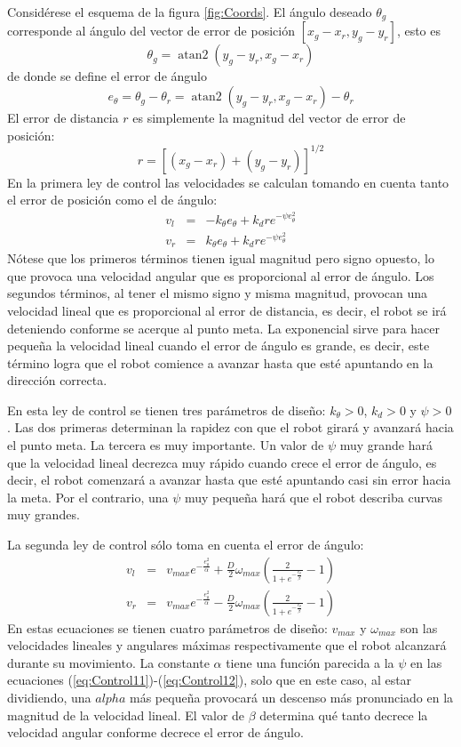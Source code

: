 \documentclass[letterpaper,12pt]{article}
\DeclareMathOperator{\atantwo}{atan2}
\begin{document}
Considérese el esquema de la figura \ref{fig:Coords}. El ángulo deseado $\theta_g$ corresponde al ángulo del vector de error de posición $\left[x_g - x_r, y_g - y_r\right]$, esto es
\[\theta_g = \atantwo\left(y_g - y_r, x_g - x_r\right)\]
de donde se define el error de ángulo
\[e_{\theta} = \theta_g - \theta_r = \atantwo\left(y_g - y_r, x_g - x_r\right) - \theta_r\]
El error de distancia $r$ es simplemente la magnitud del vector de error de posición:
\[r= \left[\left(x_g - x_r\right) + \left(y_g - y_r\right)\right]^{1/2}\]
En la primera ley de control las velocidades se calculan tomando en cuenta tanto el error de posición como el de ángulo:
\begin{eqnarray}
v_{l} &=& -k_{\theta}e_{\theta} + k_d r e^{-\psi e_{\theta}^2}\label{eq:Control11}\\
v_{r} &=&  k_{\theta}e_{\theta} + k_d r e^{-\psi e_{\theta}^2}\label{eq:Control12}
\end{eqnarray}
Nótese que los primeros términos tienen igual magnitud pero signo opuesto, lo que provoca una velocidad angular que es proporcional al error de ángulo. Los segundos términos, al tener el mismo signo y misma magnitud, provocan una velocidad lineal que es proporcional al error de distancia, es decir, el robot se irá deteniendo conforme se acerque al punto meta. La exponencial sirve para hacer pequeña la velocidad lineal cuando el error de ángulo es grande, es decir, este término logra que el robot comience a avanzar hasta que esté apuntando en la dirección correcta.

En esta ley de control se tienen tres parámetros de diseño: $k_{\theta}>0$, $k_d>0$ y $\psi>0$. Las dos primeras determinan la rapidez con que el robot girará y avanzará hacia el punto meta. La tercera es muy importante. Un valor de $\psi$ muy grande hará que la velocidad lineal decrezca muy rápido cuando crece el error de ángulo, es decir, el robot comenzará a avanzar hasta que esté apuntando casi sin error hacia la meta. Por el contrario, una $\psi$ muy pequeña hará que el robot describa curvas muy grandes.  

La segunda ley de control sólo toma en cuenta el error de ángulo:
\begin{eqnarray} 
v_{l} &=& v_{max}e^{-\frac{e_{\theta}^{2}}{\alpha}} + 
\frac{D}{2}\omega_{max}\left(\frac{2}{1+e^{-\frac{e_{\theta}}{\beta}}}-1\right)\label{eq:Control21}\\
v_{r} &=& v_{max}e^{-\frac{e_{\theta}^{2}}{\alpha}} -
\frac{D}{2}\omega_{max}\left(\frac{2}{1+e^{-\frac{e_{\theta}}{\beta}}}-1\right)\label{eq:Control22}
\end{eqnarray}
En estas ecuaciones se tienen cuatro parámetros de diseño: $v_{max}$ y $\omega_{max}$ son las velocidades lineales y angulares máximas respectivamente que el robot alcanzará durante su movimiento. La constante $\alpha$ tiene una función parecida a la $\psi$ en las ecuaciones (\ref{eq:Control11})-(\ref{eq:Control12}), solo que en este caso, al estar dividiendo, una $alpha$ más pequeña provocará un descenso más pronunciado en la magnitud de la velocidad lineal. El valor de $\beta$ determina qué tanto decrece la velocidad angular conforme decrece el error de ángulo. 
\end{document}
